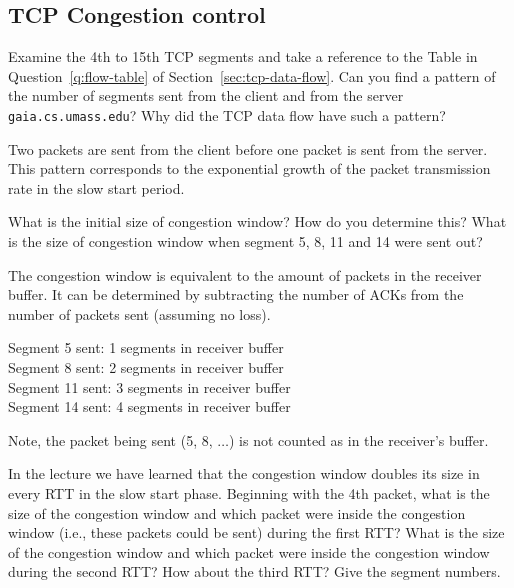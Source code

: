 \subsection{TCP Congestion control}
\begin{Question}
	Examine the 4th to 15th TCP segments and take a reference to the Table in Question~\ref{q:flow-table} of Section~\ref{sec:tcp-data-flow}. Can you find a pattern of the number of segments sent from the client and from the server \texttt{gaia.cs.umass.edu}? Why did the TCP data flow have such a pattern?
\end{Question}
\begin{Answer}
	Two packets are sent from the client before one packet is sent from the server.
	This pattern corresponds to the exponential growth of the packet transmission rate in the slow start period.
\end{Answer}

\begin{Question}
	What is the initial size of congestion window? How do you determine this? What is the size of congestion window when segment 5, 8, 11 and 14 were sent out?
\end{Question}
\begin{Answer}
	The congestion window is equivalent to the amount of packets in the receiver buffer.
	It can be determined by subtracting the number of ACKs from the number of packets sent (assuming no loss).

	Segment 5 sent: 1 segments in receiver buffer \\
	Segment 8 sent: 2 segments in receiver buffer \\
	Segment 11 sent: 3 segments in receiver buffer \\
	Segment 14 sent: 4 segments in receiver buffer

	Note, the packet being sent (5, 8, $\ldots$) is not counted as in the receiver's buffer.
\end{Answer}

\begin{Question}
	In the lecture we have learned that the congestion window doubles its size in every RTT in the slow start phase. Beginning with the 4th packet, what is the size of the congestion window and which packet were inside the congestion window (i.e., these packets could be sent) during the first RTT\@? What is the size of the congestion window and which packet were inside the congestion window during the second RTT\@? How about the third RTT\@? Give the segment numbers.
\end{Question}

